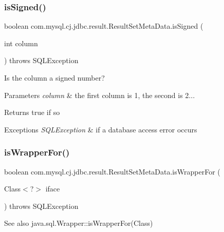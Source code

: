 \subsubsection{\texorpdfstring{is\+Signed()}{isSigned()}}
{\footnotesize\ttfamily boolean com.\+mysql.\+cj.\+jdbc.\+result.\+Result\+Set\+Meta\+Data.\+is\+Signed (\begin{DoxyParamCaption}\item[{int}]{column }\end{DoxyParamCaption}) throws S\+Q\+L\+Exception}

Is the column a signed number?


\begin{DoxyParams}{Parameters}
{\em column} & the first column is 1, the second is 2...\\
\hline
\end{DoxyParams}
\begin{DoxyReturn}{Returns}
true if so
\end{DoxyReturn}

\begin{DoxyExceptions}{Exceptions}
{\em S\+Q\+L\+Exception} & if a database access error occurs \\
\hline
\end{DoxyExceptions}
\mbox{\label{classcom_1_1mysql_1_1cj_1_1jdbc_1_1result_1_1_result_set_meta_data_a297ee666fb7b42a8df2bf1776f9d80e1}} 
\subsubsection{\texorpdfstring{is\+Wrapper\+For()}{isWrapperFor()}}
{\footnotesize\ttfamily boolean com.\+mysql.\+cj.\+jdbc.\+result.\+Result\+Set\+Meta\+Data.\+is\+Wrapper\+For (\begin{DoxyParamCaption}\item[{Class$<$?$>$}]{iface }\end{DoxyParamCaption}) throws S\+Q\+L\+Exception}

\begin{DoxySeeAlso}{See also}
java.\+sql.\+Wrapper\+::is\+Wrapper\+For(\+Class) 
\end{DoxySeeAlso}
\mbox{\label{classcom_1_1mysql_1_1cj_1_1jdbc_1_1result_1_1_result_set_meta_data_ae6883f9f19c1f3e8c515f8d6a2594e88}} 
